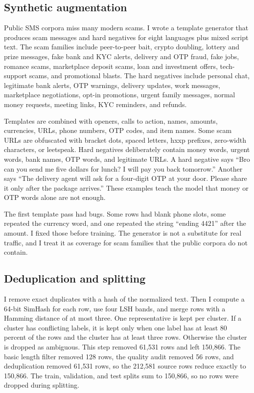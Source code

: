 \documentclass[11pt]{article}
\begin{document}
\subsection{Synthetic augmentation}

Public SMS corpora miss many modern scams. I wrote a template generator that produces scam messages and hard negatives for eight languages plus mixed script text. The scam families include peer-to-peer bait, crypto doubling, lottery and prize messages, fake bank and KYC alerts, delivery and OTP fraud, fake jobs, romance scams, marketplace deposit scams, loan and investment offers, tech-support scams, and promotional blasts. The hard negatives include personal chat, legitimate bank alerts, OTP warnings, delivery updates, work messages, marketplace negotiations, opt-in promotions, urgent family messages, normal money requests, meeting links, KYC reminders, and refunds.

Templates are combined with openers, calls to action, names, amounts, currencies, URLs, phone numbers, OTP codes, and item names. Some scam URLs are obfuscated with bracket dots, spaced letters, hxxp prefixes, zero-width characters, or leetspeak. Hard negatives deliberately contain money words, urgent words, bank names, OTP words, and legitimate URLs. A hard negative says ``Bro can you send me five dollars for lunch? I will pay you back tomorrow.'' Another says ``The delivery agent will ask for a four-digit OTP at your door. Please share it only after the package arrives.'' These examples teach the model that money or OTP words alone are not enough.

The first template pass had bugs. Some rows had blank phone slots, some repeated the currency word, and one repeated the string ``ending 4421'' after the amount. I fixed those before training. The generator is not a substitute for real traffic, and I treat it as coverage for scam families that the public corpora do not contain.

\subsection{Deduplication and splitting}

I remove exact duplicates with a hash of the normalized text. Then I compute a 64-bit SimHash for each row, use four LSH bands, and merge rows with a Hamming distance of at most three. One representative is kept per cluster. If a cluster has conflicting labels, it is kept only when one label has at least 80 percent of the rows and the cluster has at least three rows. Otherwise the cluster is dropped as ambiguous. This step removed 61,531 rows and left 150,866. The basic length filter removed 128 rows, the quality audit removed 56 rows, and deduplication removed 61,531 rows, so the 212,581 source rows reduce exactly to 150,866. The train, validation, and test splits sum to 150,866, so no rows were dropped during splitting.
\end{document}

